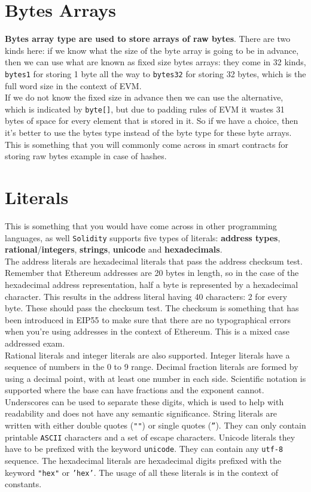 \section{Bytes Arrays}
\textbf{Bytes array type are used to store arrays of raw bytes}. There are two kinds here: if we know what the size of the byte array is going to be in advance, then we can use what are known as fixed size bytes arrays: they come in 32 kinds, \texttt{bytes1} for storing 1 byte all the way to \texttt{bytes32} for storing 32 bytes, which is the full word size in the context of EVM.\\ 

If we do not know the fixed size in advance then we can use the alternative, which is indicated by \texttt{byte[]}, but due to padding rules of EVM it wastes 31 bytes of space for every element that is stored in it. So if we have a choice, then it's better to use the bytes type instead of the byte type for these byte arrays. This is something that you will commonly come across in smart contracts for storing raw bytes example in case of hashes.

\section{Literals}
This is something that you would have come across in other programming languages, as well \texttt{Solidity} supports five types of literals: \textbf{address types}, \textbf{rational}/\textbf{integers}, \textbf{strings}, \textbf{unicode} and \textbf{hexadecimals}.\\

The address literals are hexadecimal literals that pass the address checksum test. Remember that Ethereum addresses are 20 bytes in length, so in the case of the hexadecimal address representation, half a byte is represented by a hexadecimal character. This results in the address literal having 40 characters: 2 for every byte. These should pass the checksum test. The checksum is something that has been introduced in EIP55 to make sure that there are no typographical errors when you're using addresses in the context of Ethereum. This is a mixed case addressed exam.\\

Rational literals and integer literals are also supported. Integer literals have a sequence of numbers in the 0 to 9 range. Decimal fraction literals are formed by using a decimal point, with at least one number in each side. Scientific notation is supported where the base can have fractions and the exponent cannot. Underscores can be used to separate these digits, which is used to help with readability and does not have any semantic significance. String literals are written with either double quotes (\texttt{""}) or single quotes (\texttt{''}). They can only contain printable \texttt{ASCII} characters and a set of escape characters. Unicode literals they have to be prefixed with the keyword \texttt{unicode}. They can contain any \texttt{utf-8} sequence. The hexadecimal literals are hexadecimal digits prefixed with the keyword \texttt{"hex"} or \texttt{'hex'}. The usage of all these literals is in the context of constants.\\


